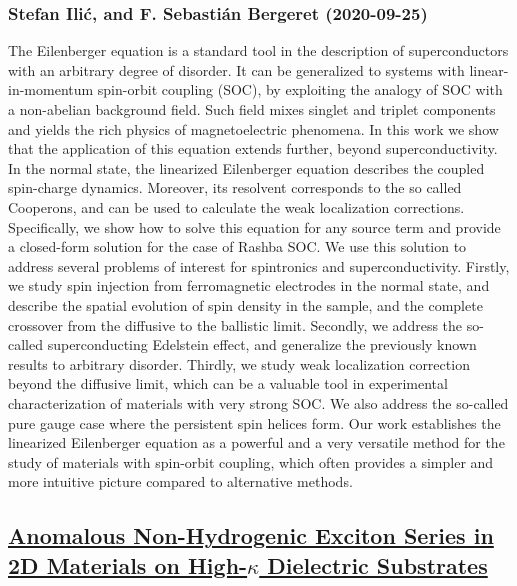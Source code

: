 \subsubsection*{Stefan Ilić, and F. Sebastián Bergeret (2020-09-25)}
The Eilenberger equation is a standard tool in the description of
superconductors with an arbitrary degree of disorder. It can be generalized to
systems with linear-in-momentum spin-orbit coupling (SOC), by exploiting the
analogy of SOC with a non-abelian background field. Such field mixes singlet
and triplet components and yields the rich physics of magnetoelectric
phenomena. In this work we show that the application of this equation extends
further, beyond superconductivity. In the normal state, the linearized
Eilenberger equation describes the coupled spin-charge dynamics. Moreover, its
resolvent corresponds to the so called Cooperons, and can be used to calculate
the weak localization corrections. Specifically, we show how to solve this
equation for any source term and provide a closed-form solution for the case of
Rashba SOC. We use this solution to address several problems of interest for
spintronics and superconductivity. Firstly, we study spin injection from
ferromagnetic electrodes in the normal state, and describe the spatial
evolution of spin density in the sample, and the complete crossover from the
diffusive to the ballistic limit. Secondly, we address the so-called
superconducting Edelstein effect, and generalize the previously known results
to arbitrary disorder. Thirdly, we study weak localization correction beyond
the diffusive limit, which can be a valuable tool in experimental
characterization of materials with very strong SOC. We also address the
so-called pure gauge case where the persistent spin helices form. Our work
establishes the linearized Eilenberger equation as a powerful and a very
versatile method for the study of materials with spin-orbit coupling, which
often provides a simpler and more intuitive picture compared to alternative
methods.

\subsection*{\href{http://arxiv.org/abs/2009.12317v1}{Anomalous Non-Hydrogenic Exciton Series in 2D Materials on High-$κ$  Dielectric Substrates}}

